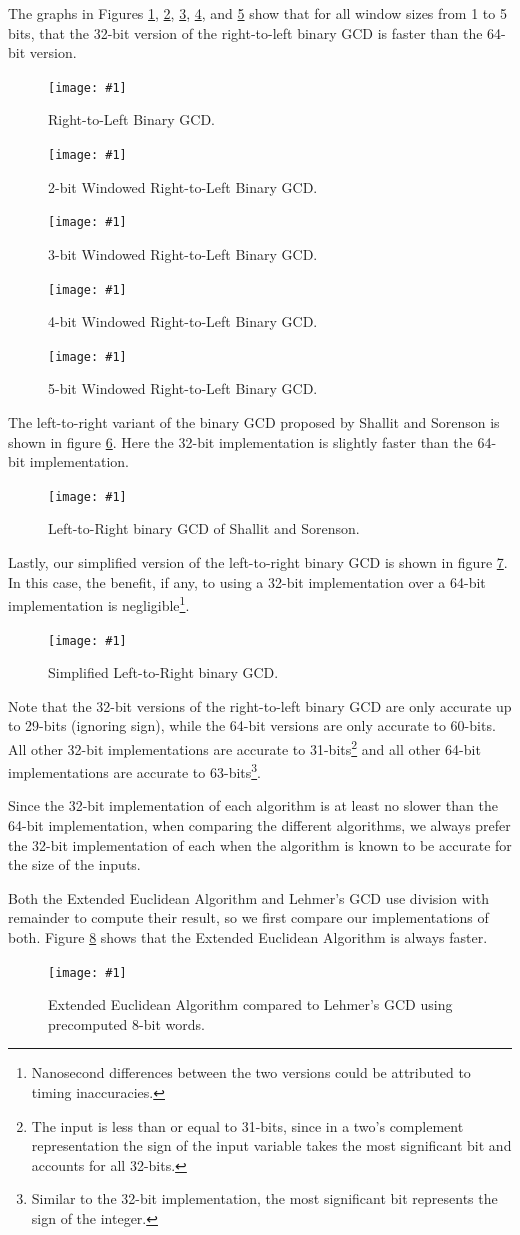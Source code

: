 \documentclass{ucalgthes1}
\theoremstyle{definition}
\newcommand{\mygraph}[3]{
	\begin{figure}[H]
	\centering
	\texttt{[image: \#1]}
	\caption{#3}
	\label{#2}
	\end{figure}
}
\begin{document}
The graphs in Figures \ref{fig:stein1-32v64}, \ref{fig:stein2-32v64}, \ref{fig:stein3-32v64}, \ref{fig:stein4-32v64}, and \ref{fig:stein5-32v64} show that for all window sizes from 1 to 5 bits, that the 32-bit version of the right-to-left binary GCD is faster than the 64-bit version.
\mygraph{stein1-32v64}{fig:stein1-32v64}{Right-to-Left Binary GCD.}
\mygraph{stein2-32v64}{fig:stein2-32v64}{2-bit Windowed Right-to-Left Binary GCD.}
\mygraph{stein3-32v64}{fig:stein3-32v64}{3-bit Windowed Right-to-Left Binary GCD.}
\mygraph{stein4-32v64}{fig:stein4-32v64}{4-bit Windowed Right-to-Left Binary GCD.}
\mygraph{stein5-32v64}{fig:stein5-32v64}{5-bit Windowed Right-to-Left Binary GCD.}

The left-to-right variant of the binary GCD proposed by Shallit and Sorenson is shown in figure \ref{fig:shallit-32v64}.  Here the 32-bit implementation is slightly faster than the 64-bit implementation.
\mygraph{shallit-32v64}{fig:shallit-32v64}{Left-to-Right binary GCD of Shallit and Sorenson.}

Lastly, our simplified version of the left-to-right binary GCD is shown in figure \ref{fig:binary_l2r-32v64}.  In this case, the benefit, if any, to using a 32-bit implementation over a 64-bit implementation is negligible\footnote{Nanosecond differences between the two versions could be attributed to timing inaccuracies.}.
\mygraph{binary_l2r-32v64}{fig:binary_l2r-32v64}{Simplified Left-to-Right binary GCD.}

Note that the 32-bit versions of the right-to-left binary GCD are only accurate up to 29-bits (ignoring sign), while the 64-bit versions are only accurate to 60-bits. All other 32-bit implementations are accurate to 31-bits\footnote{The input is less than or equal to 31-bits, since in a two's complement representation the sign of the input variable takes the most significant bit and accounts for all 32-bits.} and all other 64-bit implementations are accurate to 63-bits\footnote{Similar to the 32-bit implementation, the most significant bit represents the sign of the integer.}.

Since the 32-bit implementation of each algorithm is at least no slower than the 64-bit implementation, when comparing the different algorithms, we always prefer the 32-bit implementation of each when the algorithm is known to be accurate for the size of the inputs.

Both the Extended Euclidean Algorithm and Lehmer's GCD use division with remainder to compute their result, so we first compare our implementations of both.  Figure \ref{fig:divrem-vs-lehmer} shows that the Extended Euclidean Algorithm is always faster.
\mygraph{divrem-vs-lehmer}{fig:divrem-vs-lehmer}{Extended Euclidean Algorithm compared to Lehmer's GCD using precomputed 8-bit words.}
\end{document}
